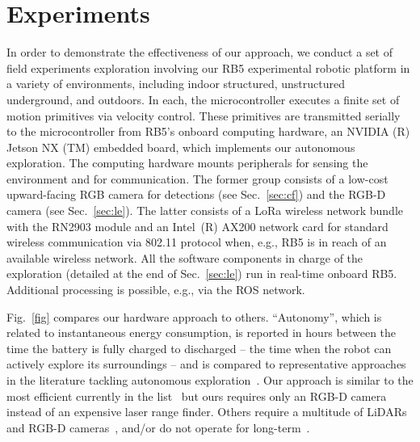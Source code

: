 \documentclass[letterpaper,10pt,conference,twoside]{IEEEtran}
\theoremstyle{definition}
\begin{document}
\section{Experiments}
\label{sec:fe}
\noindent
In order to demonstrate the effectiveness of our approach, we conduct a set of 
field experiments %
exploration involving our RB5 experimental robotic platform %
in a variety of environments, including indoor structured, unstructured underground, and outdoors. In each, the microcontroller executes a finite set of motion primitives via velocity control. These primitives are transmitted serially to the microcontroller 
from RB5's onboard computing hardware, an NVIDIA (R) Jetson NX (TM) embedded board, which implements our autonomous %
exploration. %
The computing hardware mounts peripherals for sensing the environment and for communication. The former group consists of a low-cost upward-facing RGB camera for detections (see Sec.~\ref{sec:cf}) and the RGB-D camera (see Sec.~\ref{sec:le}). The latter 
consists 
of a LoRa wireless network bundle with the RN2903 module and an Intel~(R) AX200 network card for standard wireless communication via 802.11 protocol when, e.g., RB5 is in reach of an available wireless network.
%
All the software components in charge of the exploration %
(detailed at the end of Sec.~\ref{sec:le}) run in real-time onboard RB5. Additional processing is possible, e.g., %
via the ROS network.

Fig.~\ref{fig} compares our hardware approach to others. 
``Autonomy'', which is related to instantaneous energy consumption, is reported in hours between the time the battery is fully charged to discharged -- the time when the robot can actively explore its surroundings -- and is compared to representative approaches in the literature tackling autonomous exploration~\cite{schmid2020efficient,kulkarni2022autonomous,muller2021openbot,tranzatto2022cerberus,roucek2020darpa,surmann2003autonomous}.
Our approach is similar 
to the most efficient currently in the list~\cite{surmann2003autonomous} %
but ours requires only an RGB-D camera instead of an 
expensive %
laser range finder. Others require a multitude of LiDARs and RGB-D cameras~\cite{tranzatto2022cerberus,kulkarni2022autonomous,roucek2020darpa}, and/or do not operate for long-term~\cite{schmid2020efficient,muller2021openbot}.
\end{document}
